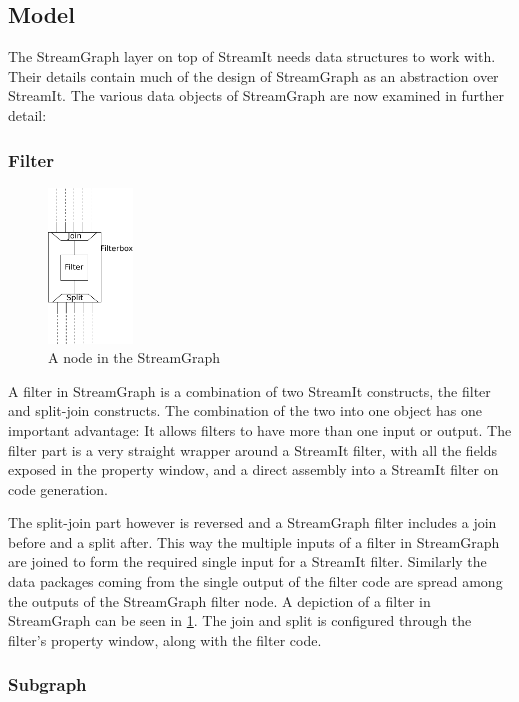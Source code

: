 \documentclass[journal]{IEEEtran}
\begin{document}
\subsection{Model}

\noindent The StreamGraph layer on top of StreamIt needs data structures to
work with. Their details contain much of the design of StreamGraph as an
abstraction over StreamIt. The various data objects of StreamGraph are now
examined in further detail:

\subsubsection{Filter}
\begin{figure}[h]
  \centering
  \includegraphics[width=0.2\textwidth]{FilterBoxGraphic}
  \caption{A node in the StreamGraph}
  \label{fig_filter_node}
\end{figure}

A filter in StreamGraph is a combination of two StreamIt constructs, the
filter and split-join constructs. The combination of the two into one object
has one important advantage: It allows filters to have more than one input or
output. The filter part is a very straight wrapper around a StreamIt filter,
with all the fields exposed in the property window, and a direct assembly into
a StreamIt filter on code generation.

The split-join part however is reversed and a StreamGraph filter includes a
join before and a split after. This way the multiple inputs of a filter in
StreamGraph are joined to form the required single input for a StreamIt
filter. Similarly the data packages coming from the single output of the
filter code are spread among the outputs of the StreamGraph filter node. 
A depiction of a filter in StreamGraph can be seen in \ref{fig_filter_node}.
The join and split is configured through the filter's property window, along 
with the filter code.

\subsubsection{Subgraph}
\end{document}
